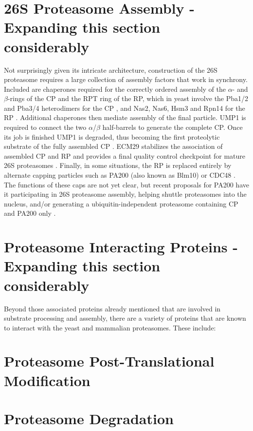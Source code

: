 \section{26S Proteasome Assembly - Expanding this section considerably}
	Not surprisingly given its intricate architecture, construction of the 26S proteasome requires a large collection of assembly factors that work in synchrony.  Included are chaperones required for the correctly ordered assembly of the $\alpha$- and $\beta$-rings of the CP and the RPT ring of the RP, which in yeast involve the Pba1/2 and Pba3/4 heterodimers for the CP \citep{kusmierczyk08, le07, tomko13}, and Nas2, Nas6, Hsm3 and Rpn14 for the RP \citep{funakoshi09, roelofs09, saeki09, tomko13}.  Additional chaperones then mediate assembly of the final particle.  UMP1 is required to connect the two $\alpha$/$\beta$ half-barrels to generate the complete CP.  Once its job is finished UMP1 is degraded, thus becoming the first proteolytic substrate of the fully assembled CP \citep{ramos98}.  ECM29 stabilizes the association of assembled CP and RP and provides a final quality control checkpoint for mature 26S proteasomes \citep{besche14, lehmann10}.  Finally, in some situations, the RP is replaced entirely by alternate capping particles such as PA200 (also known as Blm10) or CDC48 \citep{barthelme12, book10, schmidt05}.  The functions of these caps are not yet clear, but recent proposals for PA200 have it participating in 26S proteasome assembly, helping shuttle proteasomes into the nucleus, and/or generating a ubiquitin-independent proteasome containing CP and PA200 only \citep{dange11, sadre-bazzaz10, weberruss13}.

\section{Proteasome Interacting Proteins - Expanding this section considerably}
Beyond those associated proteins already mentioned that are involved in substrate processing and assembly, there are a variety of proteins that are known to interact with the yeast and mammalian proteasomes. These include:

\section{Proteasome Post-Translational Modification}

\section{Proteasome Degradation}


\begin{singlespace}


\end{singlespace}


